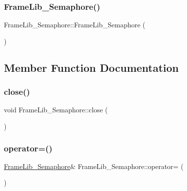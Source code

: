 \subsubsection{\texorpdfstring{Frame\+Lib\+\_\+\+Semaphore()}{FrameLib\_Semaphore()}\hspace{0.1cm}{\footnotesize\ttfamily [2/2]}}
{\footnotesize\ttfamily Frame\+Lib\+\_\+\+Semaphore\+::\+Frame\+Lib\+\_\+\+Semaphore (\begin{DoxyParamCaption}\item[{const \hyperlink{class_frame_lib___semaphore}{Frame\+Lib\+\_\+\+Semaphore} \&}]{ }\end{DoxyParamCaption})\hspace{0.3cm}{\ttfamily [delete]}}



\subsection{Member Function Documentation}
\mbox{\label{class_frame_lib___semaphore_a5d2d85054c42363761ad4bf37d167d90}} 
\subsubsection{\texorpdfstring{close()}{close()}}
{\footnotesize\ttfamily void Frame\+Lib\+\_\+\+Semaphore\+::close (\begin{DoxyParamCaption}{ }\end{DoxyParamCaption})}

\mbox{\label{class_frame_lib___semaphore_ad8c78aa4866dd72819ff35428736adde}} 
\subsubsection{\texorpdfstring{operator=()}{operator=()}}
{\footnotesize\ttfamily \hyperlink{class_frame_lib___semaphore}{Frame\+Lib\+\_\+\+Semaphore}\& Frame\+Lib\+\_\+\+Semaphore\+::operator= (\begin{DoxyParamCaption}\item[{const \hyperlink{class_frame_lib___semaphore}{Frame\+Lib\+\_\+\+Semaphore} \&}]{ }\end{DoxyParamCaption})\hspace{0.3cm}{\ttfamily [delete]}}

